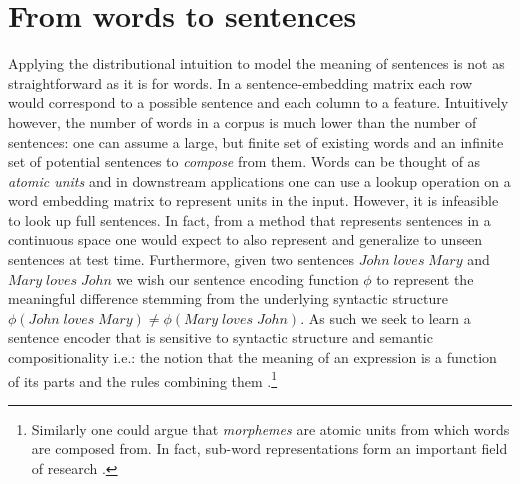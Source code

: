 \section{From words to sentences}
\label{sec:sentences}
Applying the distributional intuition to model the meaning of sentences is not as straightforward
as it is for words. In a sentence-embedding matrix each row
would correspond to a possible sentence and each column to a feature.
Intuitively however,  the number of words in a corpus is much
lower than the number of sentences: one can assume a large, but finite set
of existing words and an infinite set of
potential sentences to \emph{compose} from them.
Words can be thought of as \emph{atomic units} and
in downstream applications one can use a lookup operation on a word embedding matrix
to represent units in the input. However, it is infeasible to look up full sentences.
In fact, from a method that represents sentences in a continuous space one would expect
to also represent and generalize to unseen sentences at test time.
Furthermore, given two sentences $\mathit{John \; loves \; Mary}$ and
$\mathit{Mary \; loves \; John}$ we wish our sentence encoding function
$\phi$ to represent the meaningful difference stemming from the underlying syntactic structure
$\phi(\mathit{John \; loves \; Mary}) \neq \phi(\mathit{Mary \; loves \; John})$.
As such we seek to learn a sentence encoder that is sensitive to
syntactic structure and semantic compositionality i.e.:
the notion that the meaning of an expression is
a function of its parts and the rules combining them \citep{montague1970english}.\footnote{Similarly one could argue that \emph{morphemes} are atomic units from which words are composed from. In fact, sub-word
representations form an important field of research \citep{bojanowski2017enriching}.}

